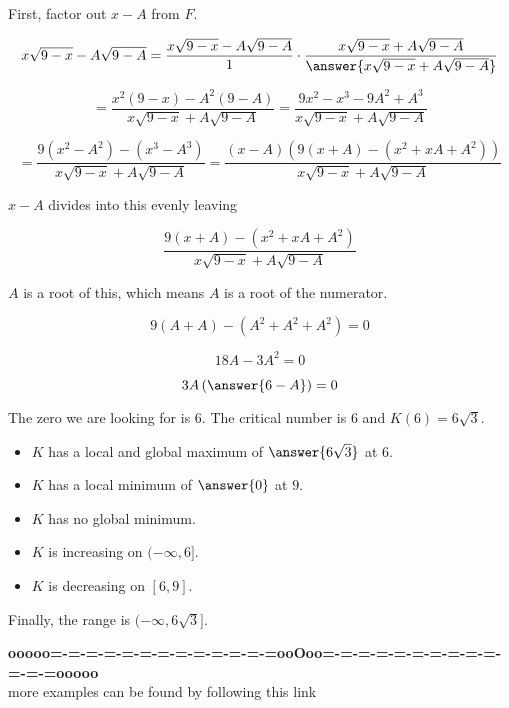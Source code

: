 \documentclass{ximera}
\begin{document}
\begin{procedure}
First, factor out $x-A$ from $F$.


\[
x\sqrt{9-x} - A\sqrt{9-A} = \frac{x\sqrt{9-x} - A\sqrt{9-A}}{1} \cdot \frac{x\sqrt{9-x} + A\sqrt{9-A}}{\answer{x\sqrt{9-x} + A\sqrt{9-A}}}
\]

\[
= \frac{x^2 (9-x) - A^2 (9-A)}{x\sqrt{9-x} + A\sqrt{9-A}} = \frac{9x^2 - x^3 - 9A^2 + A^3}{x\sqrt{9-x} + A\sqrt{9-A}}
\]


\[
= \frac{9(x^2-A^2) - (x^3 - A^3)}{x\sqrt{9-x} + A\sqrt{9-A}} = \frac{(x-A)(9(x+A)-(x^2 + xA + A^2))}{x\sqrt{9-x} + A\sqrt{9-A}}
\]


$x-A$ divides into this evenly leaving

\[
\frac{9(x+A)-(x^2 + xA + A^2)}{x\sqrt{9-x} + A\sqrt{9-A}}
\]

$A$ is a root of this, which means $A$ is a root of the numerator.


\[
9(A+A)-(A^2 + A^2 + A^2) = 0
\]

\[
18A - 3A^2 = 0
\]

\[
3A \left(\answer{6-A} \right) = 0
\]


The zero we are looking for is $6$.
The critical number is $6$ and $K(6) = 6 \sqrt{3}$.


\end{procedure}


\begin{itemize}
\item $K$ has a local and global maximum of $\answer{6\sqrt{3}}$ at $6$.
\item $K$ has a local minimum of $\answer{0}$ at $9$.
\item $K$ has no global minimum.
\end{itemize}




\begin{itemize}
\item $K$ is increasing on $(-\infty, 6]$.
\item $K$ is decreasing on $[6, 9]$.
\end{itemize}


Finally, the range is $(-\infty, 6\sqrt{3}]$. \\



















\begin{center}
\textbf{\textcolor{green!50!black}{ooooo=-=-=-=-=-=-=-=-=-=-=-=-=ooOoo=-=-=-=-=-=-=-=-=-=-=-=-=ooooo}} \\

more examples can be found by following this link\\ 

\end{center}
\end{document}
